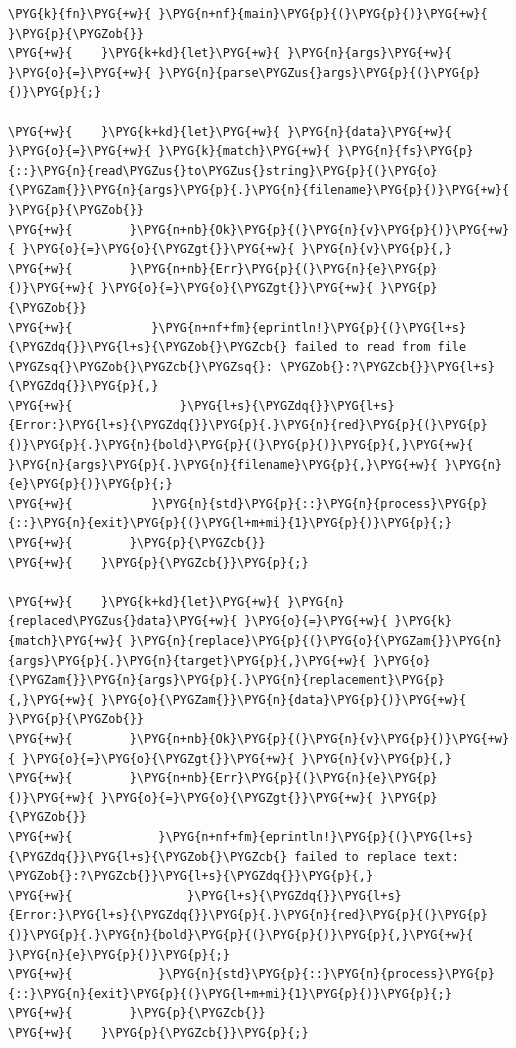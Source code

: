 \begin{Verbatim}[commandchars=\\\{\},breaklines=true,breakanywhere=true,fontsize=\codefont,xleftmargin=17bp]
\PYG{k}{fn}\PYG{+w}{ }\PYG{n+nf}{main}\PYG{p}{(}\PYG{p}{)}\PYG{+w}{ }\PYG{p}{\PYGZob{}}
\PYG{+w}{    }\PYG{k+kd}{let}\PYG{+w}{ }\PYG{n}{args}\PYG{+w}{ }\PYG{o}{=}\PYG{+w}{ }\PYG{n}{parse\PYGZus{}args}\PYG{p}{(}\PYG{p}{)}\PYG{p}{;}

\PYG{+w}{    }\PYG{k+kd}{let}\PYG{+w}{ }\PYG{n}{data}\PYG{+w}{ }\PYG{o}{=}\PYG{+w}{ }\PYG{k}{match}\PYG{+w}{ }\PYG{n}{fs}\PYG{p}{::}\PYG{n}{read\PYGZus{}to\PYGZus{}string}\PYG{p}{(}\PYG{o}{\PYGZam{}}\PYG{n}{args}\PYG{p}{.}\PYG{n}{filename}\PYG{p}{)}\PYG{+w}{ }\PYG{p}{\PYGZob{}}
\PYG{+w}{        }\PYG{n+nb}{Ok}\PYG{p}{(}\PYG{n}{v}\PYG{p}{)}\PYG{+w}{ }\PYG{o}{=}\PYG{o}{\PYGZgt{}}\PYG{+w}{ }\PYG{n}{v}\PYG{p}{,}
\PYG{+w}{        }\PYG{n+nb}{Err}\PYG{p}{(}\PYG{n}{e}\PYG{p}{)}\PYG{+w}{ }\PYG{o}{=}\PYG{o}{\PYGZgt{}}\PYG{+w}{ }\PYG{p}{\PYGZob{}}
\PYG{+w}{           }\PYG{n+nf+fm}{eprintln!}\PYG{p}{(}\PYG{l+s}{\PYGZdq{}}\PYG{l+s}{\PYGZob{}\PYGZcb{} failed to read from file \PYGZsq{}\PYGZob{}\PYGZcb{}\PYGZsq{}: \PYGZob{}:?\PYGZcb{}}\PYG{l+s}{\PYGZdq{}}\PYG{p}{,}
\PYG{+w}{               }\PYG{l+s}{\PYGZdq{}}\PYG{l+s}{Error:}\PYG{l+s}{\PYGZdq{}}\PYG{p}{.}\PYG{n}{red}\PYG{p}{(}\PYG{p}{)}\PYG{p}{.}\PYG{n}{bold}\PYG{p}{(}\PYG{p}{)}\PYG{p}{,}\PYG{+w}{ }\PYG{n}{args}\PYG{p}{.}\PYG{n}{filename}\PYG{p}{,}\PYG{+w}{ }\PYG{n}{e}\PYG{p}{)}\PYG{p}{;}
\PYG{+w}{           }\PYG{n}{std}\PYG{p}{::}\PYG{n}{process}\PYG{p}{::}\PYG{n}{exit}\PYG{p}{(}\PYG{l+m+mi}{1}\PYG{p}{)}\PYG{p}{;}
\PYG{+w}{        }\PYG{p}{\PYGZcb{}}
\PYG{+w}{    }\PYG{p}{\PYGZcb{}}\PYG{p}{;}

\PYG{+w}{    }\PYG{k+kd}{let}\PYG{+w}{ }\PYG{n}{replaced\PYGZus{}data}\PYG{+w}{ }\PYG{o}{=}\PYG{+w}{ }\PYG{k}{match}\PYG{+w}{ }\PYG{n}{replace}\PYG{p}{(}\PYG{o}{\PYGZam{}}\PYG{n}{args}\PYG{p}{.}\PYG{n}{target}\PYG{p}{,}\PYG{+w}{ }\PYG{o}{\PYGZam{}}\PYG{n}{args}\PYG{p}{.}\PYG{n}{replacement}\PYG{p}{,}\PYG{+w}{ }\PYG{o}{\PYGZam{}}\PYG{n}{data}\PYG{p}{)}\PYG{+w}{ }\PYG{p}{\PYGZob{}}
\PYG{+w}{        }\PYG{n+nb}{Ok}\PYG{p}{(}\PYG{n}{v}\PYG{p}{)}\PYG{+w}{ }\PYG{o}{=}\PYG{o}{\PYGZgt{}}\PYG{+w}{ }\PYG{n}{v}\PYG{p}{,}
\PYG{+w}{        }\PYG{n+nb}{Err}\PYG{p}{(}\PYG{n}{e}\PYG{p}{)}\PYG{+w}{ }\PYG{o}{=}\PYG{o}{\PYGZgt{}}\PYG{+w}{ }\PYG{p}{\PYGZob{}}
\PYG{+w}{            }\PYG{n+nf+fm}{eprintln!}\PYG{p}{(}\PYG{l+s}{\PYGZdq{}}\PYG{l+s}{\PYGZob{}\PYGZcb{} failed to replace text: \PYGZob{}:?\PYGZcb{}}\PYG{l+s}{\PYGZdq{}}\PYG{p}{,}
\PYG{+w}{                }\PYG{l+s}{\PYGZdq{}}\PYG{l+s}{Error:}\PYG{l+s}{\PYGZdq{}}\PYG{p}{.}\PYG{n}{red}\PYG{p}{(}\PYG{p}{)}\PYG{p}{.}\PYG{n}{bold}\PYG{p}{(}\PYG{p}{)}\PYG{p}{,}\PYG{+w}{ }\PYG{n}{e}\PYG{p}{)}\PYG{p}{;}
\PYG{+w}{            }\PYG{n}{std}\PYG{p}{::}\PYG{n}{process}\PYG{p}{::}\PYG{n}{exit}\PYG{p}{(}\PYG{l+m+mi}{1}\PYG{p}{)}\PYG{p}{;}
\PYG{+w}{        }\PYG{p}{\PYGZcb{}}
\PYG{+w}{    }\PYG{p}{\PYGZcb{}}\PYG{p}{;}


\end{Verbatim}
